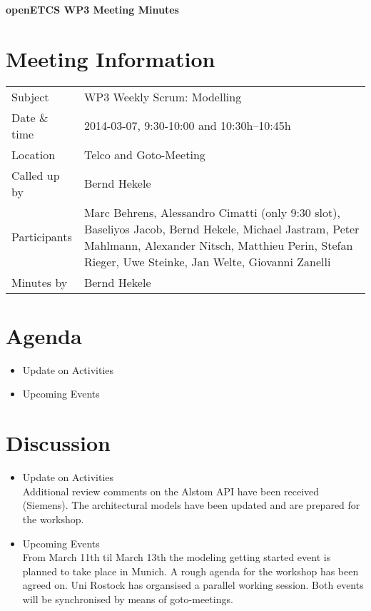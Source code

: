 \documentclass[a4paper, 11pt]{article}
\begin{document}
{\begin{center}\huge\bf openETCS WP3 Meeting Minutes\end{center}}
\section{Meeting Information}

\renewcommand{\arraystretch}{1.5}
\begin{supertabular}{m{.2\textwidth}m{.8\textwidth}}
Subject & WP3 Weekly Scrum: Modelling\\
Date \& time & 2014-03-07, 9:30-10:00 and  10:30h--10:45h\\
Location & Telco and Goto-Meeting\\
Called up by & Bernd Hekele\\
Participants &
Marc Behrens,
Alessandro Cimatti (only 9:30 slot),
Baseliyos Jacob,
Bernd Hekele,
Michael Jastram,
Peter Mahlmann,
Alexander Nitsch,
Matthieu Perin,
Stefan Rieger,
Uwe Steinke,
Jan Welte,
Giovanni Zanelli
\\

Minutes by & Bernd Hekele\\
\end{supertabular}
\renewcommand{\arraystretch}{1.0}


\section{{Agenda}}
\begin{itemize}
\item Update on Activities
\item Upcoming Events
\end{itemize}

\section{Discussion}
\begin{itemize}
\item Update on Activities\\
Additional review comments on the Alstom API have been received (Siemens).
The architectural models have been updated and are prepared for the workshop. 

\item Upcoming Events\\
From March 11th til March 13th the modeling getting started event is planned to take place in Munich. A rough agenda for the workshop has been agreed on. Uni Rostock has organsised a parallel working session. Both  events will be synchronised by means of goto-meetings.

\end{itemize}
\end{document}
